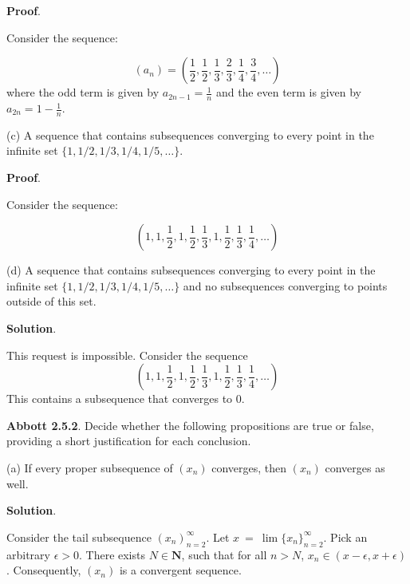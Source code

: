 \documentclass[10pt]{article}
\begin{document}
\textbf{Proof}.

Consider the sequence:


\begin{equation*}
( a_{n}) =\left(\frac{1}{2} ,\frac{1}{2} ,\frac{1}{3} ,\frac{2}{3} ,\frac{1}{4} ,\frac{3}{4} ,\dotsc \right)
\end{equation*}
where the odd term is given by $\displaystyle a_{2n-1} =\frac{1}{n}$ and the even term is given by $\displaystyle a_{2n} =1-\frac{1}{n}$.



(c) A sequence that contains subsequences converging to every point in the infinite set $\displaystyle \{1,1/2,1/3,1/4,1/5,\dotsc \}$. 



\textbf{Proof}.



Consider the sequence:


\begin{equation*}
\left( 1,1,\frac{1}{2} ,1,\frac{1}{2} ,\frac{1}{3} ,1,\frac{1}{2} ,\frac{1}{3} ,\frac{1}{4} ,\dotsc \right)
\end{equation*}




(d) A sequence that contains subsequences converging to every point in the infinite set $\displaystyle \{1,1/2,1/3,1/4,1/5,\dotsc \}$ and no subsequences converging to points outside of this set.



\textbf{Solution}. 



This request is impossible. Consider the sequence
\begin{equation*}
\left( 1,1,\frac{1}{2} ,1,\frac{1}{2} ,\frac{1}{3} ,1,\frac{1}{2} ,\frac{1}{3} ,\frac{1}{4} ,\dotsc \right)
\end{equation*}
This contains a subsequence that converges to $\displaystyle 0$. 



\textbf{Abbott 2.5.2}. Decide whether the following propositions are true or false, providing a short justification for each conclusion.



(a) If every proper subsequence of $\displaystyle ( x_{n})$ converges, then $\displaystyle ( x_{n})$ converges as well.



\textbf{Solution}.



Consider the tail subsequence $\displaystyle ( x_{n})_{n=2}^{\infty }$. Let $\displaystyle x\ =\ \lim \{x_{n}\}_{n=2}^{\infty }$. Pick an arbitrary $\displaystyle \epsilon  >0$. There exists $\displaystyle N\in \mathbf{N}$, such that for all $\displaystyle n >N$, $\displaystyle x_{n} \in ( x-\epsilon ,x+\epsilon )$. Consequently, $\displaystyle ( x_{n})$ is a convergent sequence.
\end{document}
